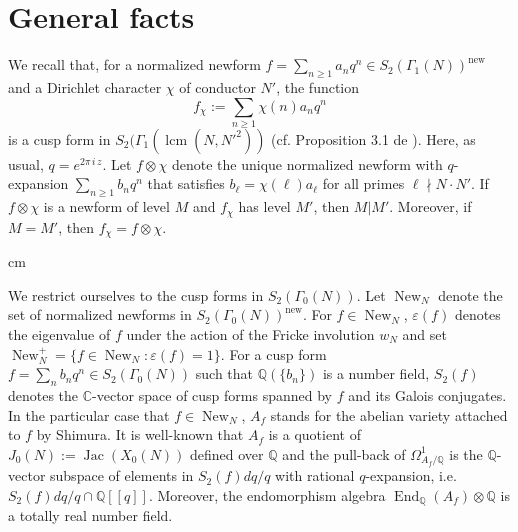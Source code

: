 \documentclass[a4paper,12pt]{article}
\theoremstyle{definition}
\theoremstyle{remark}
\numberwithin{equation}{section}
\newcommand{\Q}{\mathbb{Q}}
\newcommand{\C}{\mathbb{C}}
\newcommand{\End}{\operatorname{End}}
\newcommand{\Jac}{\operatorname{Jac}}
\newcommand{\New}{\operatorname{New}}
\begin{document}
\section{General facts}



   We recall that, for a normalized  newform $f=\sum_{n\geq 1} a_n q^n\in S_2(\Gamma_1(N))^{\operatorname{new}}$ and  a Dirichlet character  $\chi$ of conductor  $N'$, the function $$f_\chi:=\sum_{n\geq 1} \chi(n)a_n q^n$$
   is a cusp form in $S_2(\Gamma_1(\operatorname{lcm} (N, {N'}^2))$  (cf. Proposition 3.1 de \cite{Atkin}).  Here, as usual, $q=e^{2\pi \,i\,z}$.
   Let  $f\otimes \chi$ denote the unique normalized newform with $q$-expansion
$\sum_{n\geq 1} b_n q^n$ that satisfies
 $b_{\ell}=\chi(\ell) a_{\ell}$ for all primes  $\ell\nmid N\cdot N'$. If $f\otimes \chi$ is a newform of level $M$  and $f_\chi$ has level $M'$, then   $M|M'$.  Moreover, if $M=M'$, then $f_\chi=f\otimes\chi$.


 cm

We  restrict ourselves to the cusp forms in $S_2(\Gamma_0(N))$. Let   $\New_N$  denote the set of normalized newforms in   $S_2(\Gamma_0(N))^{\operatorname{new}}$. For $f\in\New_N$,   $\varepsilon(f)$ denotes  the eigenvalue of  $f$ under the action of the Fricke  involution $w_N$ and set $\New_N^+=\{f\in \New_N\colon \varepsilon(f)=1\}$.
 For a cusp form $f=\sum_n b_n q^n \in S_2(\Gamma_0(N))$ such that   $\Q(\{b_n\})$ is a number field,  $S_2(f)$ denotes the $\C$-vector space  of cusp forms spanned  by  $f$ and its  Galois conjugates.  In the particular case that  $f\in\New_N$,     $A_f$ stands for  the abelian variety attached to $f$ by Shimura. It is well-known that $A_f$ is a quotient of $J_0(N):=\Jac (X_0(N))$  defined over  $\Q$ and the  pull-back of $\Omega^1_{A_f/\Q}$  is the $\Q$-vector subspace of elements in  $S_2(f) dq/q$ with rational $q$-expansion, i.e. $S_2(f) dq/q\cap\Q[[q]]$. Moreover, the endomorphism algebra $\End_\Q(A_f)\otimes \Q$ is a totally real number field.
\end{document}
